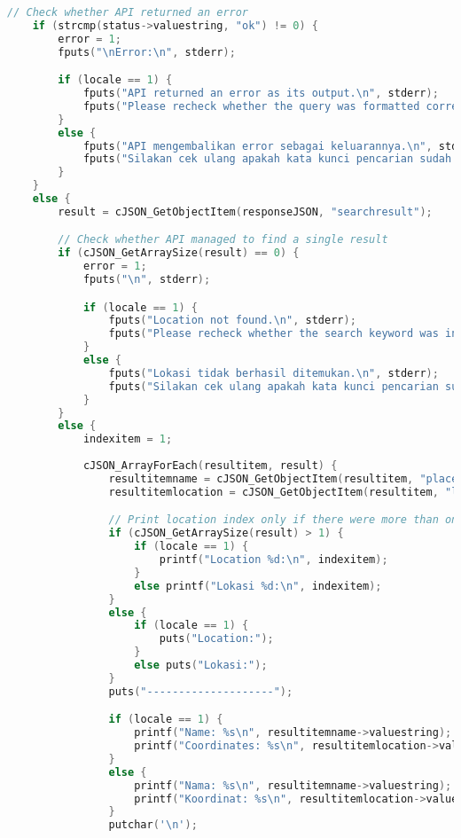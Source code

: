 \begin{itemize}[listparindent=\parindent]
\begin{lstlisting}[language=C, caption=Implementasi fungsi write\textunderscore seachplace(), label=code:kiritool-function-write-search]
    // Check whether API returned an error
    if (strcmp(status->valuestring, "ok") != 0) {
        error = 1;
        fputs("\nError:\n", stderr);

        if (locale == 1) {
            fputs("API returned an error as its output.\n", stderr);
            fputs("Please recheck whether the query was formatted correctly.\n", stderr);
        }
        else {
            fputs("API mengembalikan error sebagai keluarannya.\n", stderr);
            fputs("Silakan cek ulang apakah kata kunci pencarian sudah diformat dengan benar.\n", stderr);
        }
    }
    else {
        result = cJSON_GetObjectItem(responseJSON, "searchresult");

        // Check whether API managed to find a single result
        if (cJSON_GetArraySize(result) == 0) {
            error = 1;
            fputs("\n", stderr);

            if (locale == 1) {
                fputs("Location not found.\n", stderr);
                fputs("Please recheck whether the search keyword was inputted correctly.\n", stderr);
            }
            else {
                fputs("Lokasi tidak berhasil ditemukan.\n", stderr);
                fputs("Silakan cek ulang apakah kata kunci pencarian sudah dimasukkan dengan benar.\n", stderr);
            }
        }
        else {
            indexitem = 1;
            
            cJSON_ArrayForEach(resultitem, result) {
                resultitemname = cJSON_GetObjectItem(resultitem, "placename");
                resultitemlocation = cJSON_GetObjectItem(resultitem, "location");

                // Print location index only if there were more than one found
                if (cJSON_GetArraySize(result) > 1) {
                    if (locale == 1) {
                        printf("Location %d:\n", indexitem);
                    }
                    else printf("Lokasi %d:\n", indexitem);
                }
                else {
                    if (locale == 1) {
                        puts("Location:");
                    }
                    else puts("Lokasi:");
                }
                puts("--------------------");

                if (locale == 1) {
                    printf("Name: %s\n", resultitemname->valuestring);
                    printf("Coordinates: %s\n", resultitemlocation->valuestring);
                }
                else {
                    printf("Nama: %s\n", resultitemname->valuestring);
                    printf("Koordinat: %s\n", resultitemlocation->valuestring);
                }
                putchar('\n');


\end{lstlisting}
\end{itemize}
